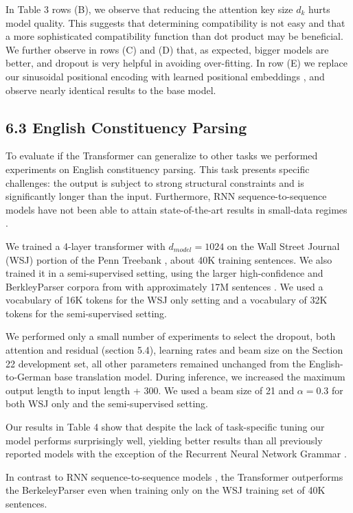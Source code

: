 \documentclass[12pt, a4paper]{article}
\begin{document}
In Table 3 rows (B), we observe that reducing the attention key size $d_k$ hurts model quality. This suggests that determining compatibility is not easy and that a more sophisticated compatibility function than dot product may be beneficial. We further observe in rows (C) and (D) that, as expected, bigger models are better, and dropout is very helpful in avoiding over-fitting. In row (E) we replace our sinusoidal positional encoding with learned positional embeddings \cite{ref9}, and observe nearly identical results to the base model.

\subsection{6.3 English Constituency Parsing}

To evaluate if the Transformer can generalize to other tasks we performed experiments on English constituency parsing. This task presents specific challenges: the output is subject to strong structural constraints and is significantly longer than the input. Furthermore, RNN sequence-to-sequence models have not been able to attain state-of-the-art results in small-data regimes \cite{ref37}.

We trained a 4-layer transformer with $d_{model} = 1024$ on the Wall Street Journal (WSJ) portion of the Penn Treebank \cite{ref25}, about 40K training sentences. We also trained it in a semi-supervised setting, using the larger high-confidence and BerkleyParser corpora from with approximately 17M sentences \cite{ref37}. We used a vocabulary of 16K tokens for the WSJ only setting and a vocabulary of 32K tokens for the semi-supervised setting.

We performed only a small number of experiments to select the dropout, both attention and residual (section 5.4), learning rates and beam size on the Section 22 development set, all other parameters remained unchanged from the English-to-German base translation model. During inference, we increased the maximum output length to input length + 300. We used a beam size of 21 and $\alpha = 0.3$ for both WSJ only and the semi-supervised setting.

Our results in Table 4 show that despite the lack of task-specific tuning our model performs surprisingly well, yielding better results than all previously reported models with the exception of the Recurrent Neural Network Grammar \cite{ref8}.

In contrast to RNN sequence-to-sequence models \cite{ref37}, the Transformer outperforms the BerkeleyParser \cite{ref29} even when training only on the WSJ training set of 40K sentences.
\end{document}
